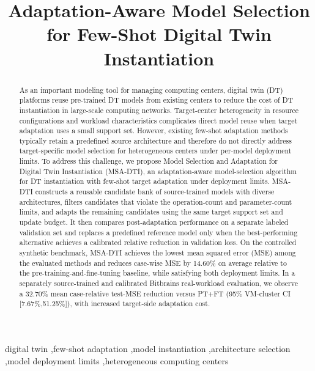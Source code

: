 \documentclass[a4paper,fleqn]{cas-sc}
\begin{document}
\setlength{\abovedisplayskip}{0pt plus 1pt minus 0pt}
\setlength{\belowdisplayskip}{5pt plus 1pt minus 1pt}
\setlength{\abovedisplayshortskip}{0pt plus 1pt minus 0pt}
\setlength{\belowdisplayshortskip}{5pt plus 1pt minus 1pt}


\title[mode=title]{Adaptation-Aware Model Selection for Few-Shot Digital Twin Instantiation}

\begin{abstract}
As an important modeling tool for managing computing centers, digital twin
(DT) platforms reuse pre-trained DT models from existing centers to reduce the
cost of DT instantiation in large-scale computing networks. Target-center
heterogeneity in resource configurations and workload characteristics
complicates direct model reuse when target adaptation uses a small support set.
However, existing few-shot adaptation methods typically retain a predefined
source architecture and therefore do not directly address target-specific
model selection for heterogeneous centers under per-model deployment limits.
To address this challenge, we propose Model Selection and Adaptation for
Digital Twin Instantiation (MSA-DTI), an adaptation-aware model-selection
algorithm for DT instantiation with few-shot target adaptation under deployment
limits. MSA-DTI constructs a reusable candidate bank of source-trained models
with diverse architectures, filters candidates that violate the operation-count
and parameter-count limits, and adapts the remaining candidates using the same
target support set and update budget. It then compares post-adaptation
performance on a separate labeled validation set and replaces a predefined reference model only when the
best-performing alternative achieves a calibrated relative reduction in
validation loss. On the controlled synthetic benchmark, MSA-DTI achieves the lowest mean
squared error (MSE) among the evaluated methods and reduces case-wise MSE by
14.60\% on average relative to the pre-training-and-fine-tuning baseline,
while satisfying both deployment limits. In a separately source-trained and calibrated Bitbrains real-workload
evaluation, we observe a 32.70\% mean case-relative test-MSE reduction
versus PT+FT (95\% VM-cluster CI [7.67\%,51.25\%]), with increased
target-side adaptation cost.
\end{abstract}

\begin{keywords}
digital twin
\sep few-shot adaptation
\sep model instantiation
\sep architecture selection
\sep model deployment limits
\sep heterogeneous computing centers
\end{keywords}
\end{document}

